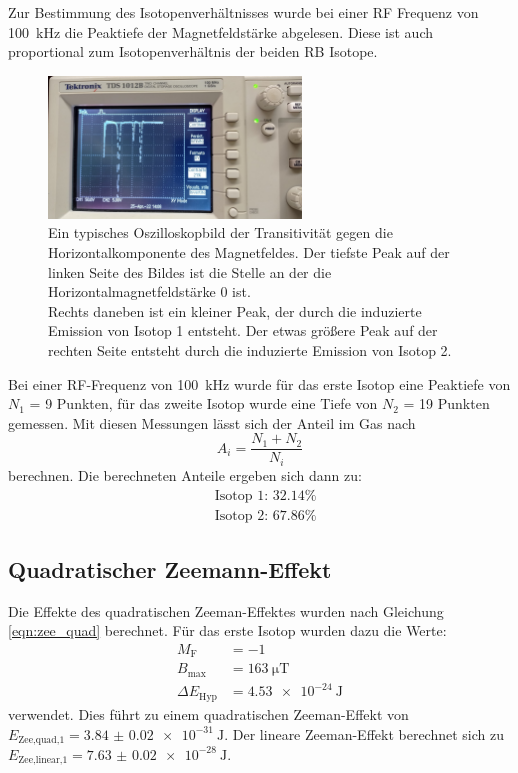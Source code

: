 		\noindent
		Zur Bestimmung des Isotopenverhältnisses wurde bei einer RF Frequenz von \SI{100}{\kilo\hertz} die Peaktiefe der Magnetfeldstärke abgelesen.
		Diese ist auch proportional zum Isotopenverhältnis der beiden RB Isotope.
		
		\begin{figure}[H]
			\centering
			\includegraphics[width=0.6\textwidth]{latex/images/Messbild.jpeg}
			\caption{Ein typisches Oszilloskopbild der Transitivität gegen die Horizontalkomponente des Magnetfeldes. 
			Der tiefste Peak auf der linken Seite des Bildes ist die Stelle an der die Horizontalmagnetfeldstärke 0 ist.\\
			Rechts daneben ist ein kleiner Peak, der durch die induzierte Emission von Isotop 1 entsteht. 
			Der etwas größere Peak auf der rechten Seite entsteht durch die induzierte Emission von Isotop 2.}
		\end{figure}

		\noindent
		Bei einer RF-Frequenz von \SI{100}{\kilo\hertz} wurde für das erste Isotop eine Peaktiefe von $N_1$ = 9 Punkten, für das zweite Isotop wurde eine Tiefe von $N_2$ = 19 Punkten gemessen.
		Mit diesen Messungen lässt sich der Anteil im Gas nach 
		\begin{equation}
			A_i = \frac{N_1 + N_2}{N_i}
		\end{equation}
		berechnen.
		Die berechneten Anteile ergeben sich dann zu:
		\begin{align*}
			&\text{Isotop 1: } \num{32.14}\%\\
			&\text{Isotop 2: } \num{67.86}\%
		\end{align*}

	
	\subsection{Quadratischer Zeemann-Effekt}

		\noindent
		Die Effekte des quadratischen Zeeman-Effektes wurden nach Gleichung \ref{eqn:zee_quad} berechnet.
		Für das erste Isotop wurden dazu die Werte:
		\begin{align*}
			M_\text{F} &= -1\\
			B_\text{max} &= \SI{163}{\micro\tesla}\\
			\Delta E_\text{Hyp} &= \SI{4.53 e-24}{\joule}
		\end{align*}
		verwendet. Dies führt zu einem quadratischen Zeeman-Effekt von $E_\text{Zee,quad,1} = \SI{3.84(2)e-31}{\joule}.$
		Der lineare Zeeman-Effekt berechnet sich zu $E_\text{Zee,linear,1} = \SI{7.63(2)e-28}{\joule}$.

